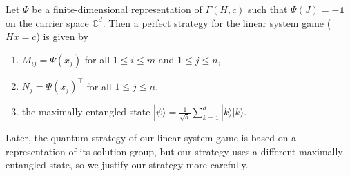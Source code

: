 \documentclass[11pt,letterpaper]{article}
\newcommand{\ket}[1]{|#1\rangle}
\newcommand{\tp}{^\intercal}
\newcommand{\C}{\mathbb{C}}
\newcommand{\1}{\mathbb{1}}
\newcommand{\sd}{\sqrt{d}}
\theoremstyle{definition}
\begin{document}
Let $\Psi$ be a finite-dimensional representation of $\Gamma(H, c)$ such that $\Psi(J) = -\1$ on the carrier space $\C^d$. Then a perfect strategy for 
the linear system game ($Hx = c$) is given by 
\begin{enumerate}
	\item $M_{ij} = \Psi(x_j)$ for all $ 1 \leq i \leq m$ and $1 \leq j \leq n$,
	\item $N_j = \Psi(x_j)\tp$ for all $1 \leq j \leq n$, 
	\item the maximally entangled state $\ket{\psi} = \frac{1}{\sd} \sum_{k=1}^d \ket{k}\ket{k}$.
\end{enumerate}
Later, the quantum strategy of our linear system game is based on a representation of its solution group,
but our strategy uses a different maximally entangled state,
so we justify our strategy more carefully.

\end{document}
